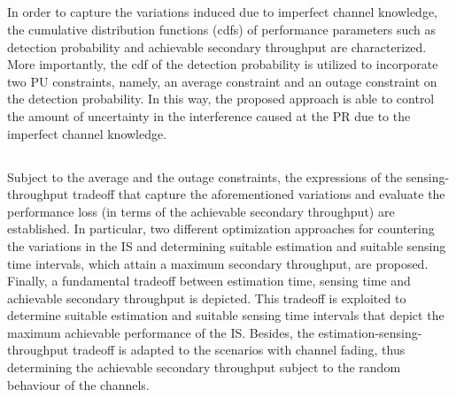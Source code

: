 \subsection{}
In order to capture the variations induced due to imperfect channel knowledge, the cumulative distribution functions (cdfs) of performance parameters such as detection probability and achievable secondary throughput are characterized. More importantly, the cdf of the detection probability is utilized to incorporate two PU constraints, namely, an average constraint and an outage constraint on the detection probability. In this way, the proposed approach is able to control the amount of uncertainty in the interference caused at the PR due to the imperfect channel knowledge. 
\subsection{}
Subject to the average and the outage constraints, the expressions of the sensing-throughput tradeoff that capture the aforementioned variations and evaluate the performance loss (in terms of the achievable secondary throughput) are established. In particular, two different optimization approaches for countering the variations in the IS and determining suitable estimation and suitable sensing time intervals, which attain a maximum secondary throughput, are proposed. Finally, a fundamental tradeoff between estimation time, sensing time and achievable secondary throughput is depicted. This tradeoff is exploited to determine suitable estimation and suitable sensing time intervals that depict the maximum achievable performance of the IS. 
Besides, %
the estimation-sensing-throughput tradeoff is adapted to the scenarios with channel fading, thus determining the achievable secondary throughput subject to the random behaviour of the channels.
 
